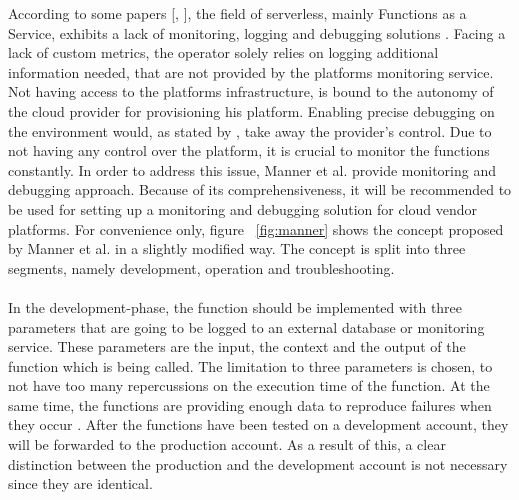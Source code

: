 \documentclass[11pt]{article}
\begin{document}
According to some papers [\cite{roberts2017serverless}, \cite{baldini2017serverless}], the field of serverless, mainly Functions as a Service, exhibits a lack of monitoring, logging and debugging solutions \cite{kritikos2018review}. Facing a lack of custom metrics, the operator solely relies on logging additional information needed, that are not provided by the platforms monitoring service. Not having access to the platforms infrastructure, is bound to the autonomy of the cloud provider for provisioning his platform. Enabling precise debugging on the environment would, as stated by \cite{manner2019troubleshooting}, take away the provider's control. Due to not having any control over the platform, it is crucial to monitor the functions constantly. In order to address this issue, Manner et al. provide monitoring and debugging approach. Because of its comprehensiveness, it will be recommended to be used for setting up a monitoring and debugging solution for cloud vendor platforms. For convenience only, figure ~\ref{fig:manner} shows the concept proposed by Manner et al. in a slightly modified way. The concept is split into three segments, namely development, operation and troubleshooting.\\\\ In the development-phase, the function should be implemented with three parameters that are going to be logged to an external database or monitoring service. These parameters are the input, the context and the output of the function which is being called. The limitation to three parameters is chosen, to not have too many repercussions on the execution time of the function. At the same time, the functions are providing enough data to reproduce failures when they occur \cite{manner2019troubleshooting}. After the functions have been tested on a development account, they will be forwarded to the production account. As a result of this, a clear distinction between the production and the development account is not necessary since they are identical. \\
\end{document}
